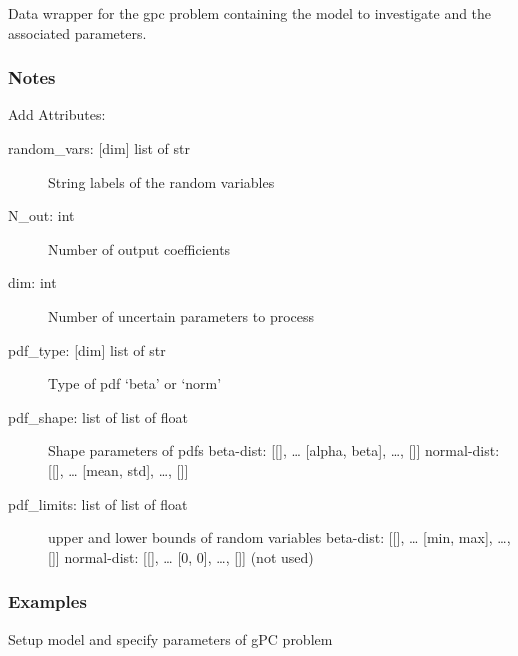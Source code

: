\documentclass[letterpaper,10pt,english,openany,oneside]{sphinxmanual}
\begin{document}
\begin{fulllineitems}
\label{\detokenize{pygpc:pygpc.Problem.Problem}}
Data wrapper for the gpc problem containing the model to investigate and the associated parameters.
\subsubsection*{Notes}

Add Attributes:
\begin{description}
\item[{random\_vars: {[}dim{]} list of str}] \leavevmode
String labels of the random variables

\item[{N\_out: int}] \leavevmode
Number of output coefficients

\item[{dim: int}] \leavevmode
Number of uncertain parameters to process

\item[{pdf\_type: {[}dim{]} list of str}] \leavevmode
Type of pdf ‘beta’ or ‘norm’

\item[{pdf\_shape: list of list of float}] \leavevmode
Shape parameters of pdfs
beta-dist:   {[}{[}{]}, … {[}alpha, beta{]}, …, {[}{]}{]}
normal-dist: {[}{[}{]}, … {[}mean, std{]}, …, {[}{]}{]}

\item[{pdf\_limits: list of list of float}] \leavevmode
upper and lower bounds of random variables
beta-dist:   {[}{[}{]}, … {[}min, max{]}, …, {[}{]}{]}
normal-dist: {[}{[}{]}, … {[}0, 0{]}, …, {[}{]}{]} (not used)

\end{description}
\subsubsection*{Examples}

Setup model and specify parameters of gPC problem


\end{fulllineitems}
\end{document}
